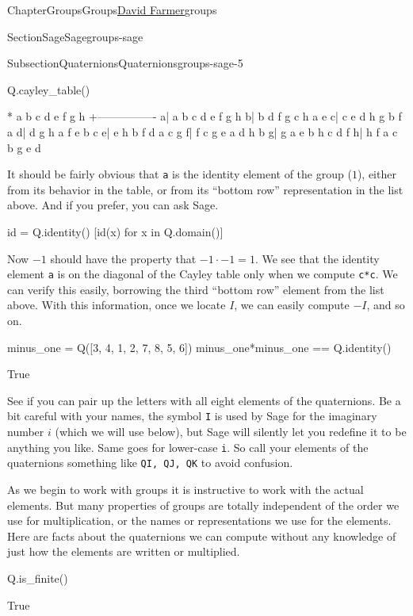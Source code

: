 \documentclass[oneside,10pt,]{book}
\newcommand{\mono}[1]{\texttt{#1}}
\numberwithin{equation}{section}
\begin{document}
\begin{chapterptx}{Chapter}{Groups}{}{Groups}{\hyperlink{dfarmer}{David Farmer}}{}{groups}
\begin{sectionptx}{Section}{Sage}{}{Sage}{}{}{groups-sage}
\begin{subsectionptx}{Subsection}{Quaternions}{}{Quaternions}{}{}{groups-sage-5}
\begin{sageinput}
Q.cayley_table()
\end{sageinput}
\begin{sageoutput}
*  a b c d e f g h
 +----------------
a| a b c d e f g h
b| b d f g c h a e
c| c e d h g b f a
d| d g h a f e b c
e| e h b f d a c g
f| f c g e a d h b
g| g a e b h c d f
h| h f a c b g e d
\end{sageoutput}
It should be fairly obvious that \mono{a} is the identity element of the group (\(1\)), either from its behavior in the table, or from its ``bottom row'' representation in the list above.  And if you prefer, you can ask Sage.%
\begin{sageinput}
id = Q.identity()
[id(x) for x in Q.domain()]
\end{sageinput}
\begin{sageoutput}
[1, 2, 3, 4, 5, 6, 7, 8]
\end{sageoutput}
Now \(-1\) should have the property that \(-1\cdot -1= 1\).  We see that the identity element \mono{a} is on the diagonal of the Cayley table only when we compute \mono{c*c}.  We can verify this easily, borrowing the third ``bottom row'' element from the list above.  With this information, once we locate \(I\), we can easily compute \(-I\), and so on.%
\begin{sageinput}
minus_one = Q([3, 4, 1, 2, 7, 8, 5, 6])
minus_one*minus_one == Q.identity()
\end{sageinput}
\begin{sageoutput}
True
\end{sageoutput}
See if you can pair up the letters with all eight elements of the quaternions.  Be a bit careful with your names, the symbol \mono{I} is used by Sage for the imaginary number \(i\) (which we will use below), but Sage will silently let you redefine it to be anything you like.  Same goes for lower-case \mono{i}.  So call your elements of the quaternions something like \mono{QI, QJ, QK} to avoid confusion.%
\par
As we begin to work with groups it is instructive to work with the actual elements.  But many properties of groups are totally independent of the order we use for multiplication, or the names or representations we use for the elements.  Here are facts about the quaternions we can compute without any knowledge of just how the elements are written or multiplied.%
\begin{sageinput}
Q.is_finite()
\end{sageinput}
\begin{sageoutput}
True
\end{sageoutput}

\end{subsectionptx}
\end{sectionptx}
\end{chapterptx}
\end{document}
